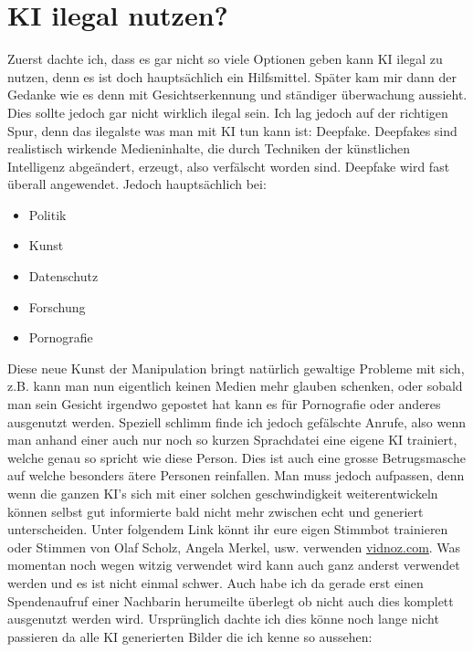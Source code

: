 \section{KI ilegal nutzen?}
Zuerst dachte ich, dass es gar nicht so viele Optionen geben kann KI ilegal zu nutzen, denn es ist doch hauptsächlich ein Hilfsmittel.
Später kam mir dann der Gedanke wie es denn mit Gesichtserkennung und ständiger überwachung aussieht. Dies sollte jedoch gar nicht wirklich ilegal sein. 
Ich lag jedoch auf der richtigen Spur, denn das ilegalste was man mit KI tun kann ist: Deepfake.
Deepfakes sind realistisch wirkende Medieninhalte, die durch Techniken der künstlichen Intelligenz abgeändert, erzeugt, also verfälscht worden sind.\citep{deepfake-wikipedia}
Deepfake wird fast überall angewendet. Jedoch hauptsächlich bei:
\begin{itemize}
    \item Politik
    \item Kunst
    \item Datenschutz
    \item Forschung
    \item Pornografie
\end{itemize}
Diese neue Kunst der Manipulation bringt natürlich gewaltige Probleme mit sich, z.B. kann man nun eigentlich keinen Medien mehr glauben schenken, oder sobald man sein Gesicht irgendwo gepostet hat kann es für Pornografie oder anderes ausgenutzt werden.
Speziell schlimm finde ich jedoch gefälschte Anrufe, also wenn man anhand einer auch nur noch so kurzen Sprachdatei eine eigene KI trainiert, welche genau so spricht wie diese Person. Dies ist auch eine grosse Betrugsmasche auf welche besonders ätere Personen reinfallen. Man muss jedoch aufpassen, denn wenn die ganzen KI's sich mit einer solchen geschwindigkeit weiterentwickeln können selbst gut informierte bald nicht mehr zwischen echt und generiert unterscheiden.
Unter folgendem Link könnt ihr eure eigen Stimmbot trainieren oder Stimmen von Olaf Scholz, Angela Merkel, usw. verwenden \href{https://de.vidnoz.com/stimme-klonen.html?insur=degooglecamp_voiceclone_stimmen%20ai%20eigene%20stimme&gad_source=1&gclid=CjwKCAjwx-CyBhAqEiwAeOcTdXzrCxZKDQlEb6uY7WpuKmMl4A4Kjq1nL8A8dgPwKI11yVB6GCWjixoCfvIQAvD_BwE}{vidnoz.com}.
Was momentan noch wegen witzig verwendet wird kann auch ganz anderst verwendet werden und es ist nicht einmal schwer.
Auch habe ich da gerade erst einen Spendenaufruf einer Nachbarin herumeilte überlegt ob nicht auch dies komplett ausgenutzt werden wird.
\newpage
Ursprünglich dachte ich dies könne noch lange nicht passieren da alle KI generierten Bilder die ich kenne so aussehen:
